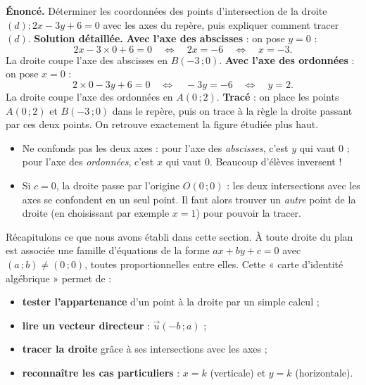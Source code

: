 \documentclass[11pt]{article}
\newcounter{popsec}
\newcounter{popsub}
\newcommand{\courssub}[1]{%
  \stepcounter{popsub}%
  \par\vspace{9pt}\noindent{\popxbold\fontsize{11.5}{13}\selectfont\color{popink}{\color{poporange}\thepopsec.\thepopsub}\hspace{6pt}#1}\par\nopagebreak\vspace{4pt}
}
\begin{document}
\begin{exoresolu}[Tracer $(d) : 2x - 3y + 6 = 0$ à partir de ses intersections avec les axes]
\textbf{Énoncé.} Déterminer les coordonnées des points d'intersection de la droite $(d) : 2x - 3y + 6 = 0$ avec les axes du repère, puis expliquer comment tracer $(d)$.
\tcblower
\textbf{Solution détaillée.}
\textbf{Avec l'axe des abscisses} : on pose $y = 0$ :
\[
2x - 3\times 0 + 6 = 0 \quad\Longleftrightarrow\quad 2x = -6 \quad\Longleftrightarrow\quad x = -3.
\]
La droite coupe l'axe des abscisses en $B(-3\,;0)$.
\textbf{Avec l'axe des ordonnées} : on pose $x = 0$ :
\[
2\times 0 - 3y + 6 = 0 \quad\Longleftrightarrow\quad -3y = -6 \quad\Longleftrightarrow\quad y = 2.
\]
La droite coupe l'axe des ordonnées en $A(0\,;2)$.
\textbf{Tracé} : on place les points $A(0\,;2)$ et $B(-3\,;0)$ dans le repère, puis on trace à la règle la droite passant par ces deux points. On retrouve exactement la figure étudiée plus haut.
\end{exoresolu}

\begin{attention}
\begin{itemize}
\item Ne confonds pas les deux axes : pour l'axe des \emph{abscisses}, c'est $y$ qui vaut $0$ ; pour l'axe des \emph{ordonnées}, c'est $x$ qui vaut $0$. Beaucoup d'élèves inversent !
\item Si $c = 0$, la droite passe par l'origine $O(0\,;0)$ : les deux intersections avec les axes se confondent en un seul point. Il faut alors trouver un \emph{autre} point de la droite (en choisissant par exemple $x = 1$) pour pouvoir la tracer.
\end{itemize}
\end{attention}

\courssub{Synthèse et ouverture}

Récapitulons ce que nous avons établi dans cette section. À toute droite du plan est associée une famille d'équations de la forme $ax + by + c = 0$ avec $(a\,;b) \neq (0\,;0)$, toutes proportionnelles entre elles. Cette « carte d'identité algébrique » permet de :
\begin{itemize}
\item \textbf{tester l'appartenance} d'un point à la droite par un simple calcul ;
\item \textbf{lire un vecteur directeur} : $\vec{u}(-b\,;a)$ ;
\item \textbf{tracer la droite} grâce à ses intersections avec les axes ;
\item \textbf{reconnaître les cas particuliers} : $x = k$ (verticale) et $y = k$ (horizontale).
\end{itemize}
\end{document}

